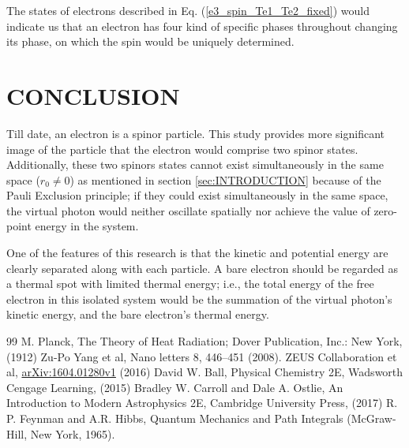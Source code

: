 \documentclass[%
 reprint,
 amsmath,amssymb,
 aps,
]{revtex4-1}
\numberwithin{equation}{section}%
\begin{document}
    The states of electrons described in Eq. (\ref{e3_spin_Te1_Te2_fixed}) would indicate us that an electron has four kind of specific phases throughout changing its phase, on which the spin would be uniquely determined.






\section{\label{sec:CONCLUSION}CONCLUSION}

    Till date, an electron is a spinor particle. This study provides more significant image of the particle that the electron would comprise two spinor states. Additionally, these two spinors states cannot exist simultaneously in the same space ($r_{0} \neq 0$) as mentioned in section \ref{sec:INTRODUCTION} because of the Pauli Exclusion principle; if they could exist simultaneously in the same space, the virtual photon would neither oscillate spatially nor achieve the value of zero-point energy in the system.

    One of the features of this research is that the kinetic and potential energy are clearly separated along with each particle. A bare electron should be regarded as a thermal spot with limited thermal energy; i.e., the total energy of the free electron in this isolated system would be the summation of the virtual photon's kinetic energy, and the bare electron's thermal energy. 





\begin{thebibliography}{99}
     M. Planck, The Theory of Heat Radiation; Dover Publication, Inc.: New York, (1912)
     Zu-Po Yang et al, Nano letters 8, 446--451 (2008). %
     ZEUS Collaboration et al, \href{https://arxiv.org/abs/1604.01280}{arXiv:1604.01280v1} (2016) %
     David W. Ball, Physical Chemistry 2E, Wadsworth Cengage Learning, (2015)
     Bradley W. Carroll and Dale A. Ostlie, An Introduction to Modern Astrophysics 2E, Cambridge University Press, (2017)  %
     R. P. Feynman and A.R. Hibbs, Quantum Mechanics and Path Integrals (McGraw-Hill, New York, 1965).

\end{thebibliography}
\end{document}
